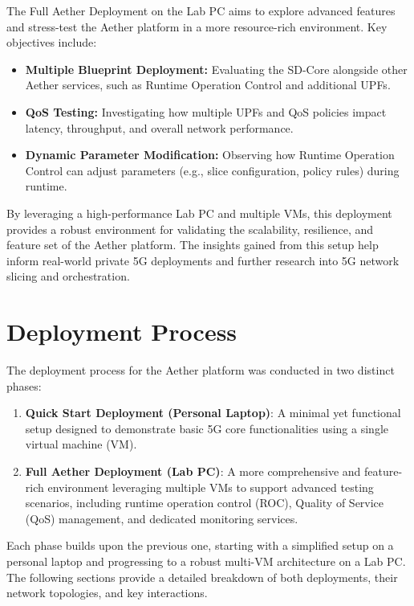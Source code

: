 The Full Aether Deployment on the Lab PC aims to explore advanced features and stress-test the Aether platform in a more resource-rich environment. Key objectives include:

\begin{itemize}
    \item \textbf{Multiple Blueprint Deployment:}  
    Evaluating the SD-Core alongside other Aether services, such as Runtime Operation Control and additional UPFs.

    \item \textbf{QoS Testing:}  
    Investigating how multiple UPFs and QoS policies impact latency, throughput, and overall network performance.

    \item \textbf{Dynamic Parameter Modification:}  
    Observing how Runtime Operation Control can adjust parameters (e.g., slice configuration, policy rules) during runtime.
\end{itemize}


By leveraging a high-performance Lab PC and multiple VMs, this deployment provides a robust environment for validating the scalability, resilience, and feature set of the Aether platform. The insights gained from this setup help inform real-world private 5G deployments and further research into 5G network slicing and orchestration.




\section{Deployment Process}
\label{sec:deployment-process}

The deployment process for the Aether platform was conducted in two distinct phases: 
\begin{enumerate}
    \item \textbf{Quick Start Deployment (Personal Laptop)}: A minimal yet functional setup designed to demonstrate basic 5G core functionalities using a single virtual machine (VM).
    \item \textbf{Full Aether Deployment (Lab PC)}: A more comprehensive and feature-rich environment leveraging multiple VMs to support advanced testing scenarios, including runtime operation control (ROC), Quality of Service (QoS) management, and dedicated monitoring services.
\end{enumerate}

Each phase builds upon the previous one, starting with a simplified setup on a personal laptop and progressing to a robust multi-VM architecture on a Lab PC. The following sections provide a detailed breakdown of both deployments, their network topologies, and key interactions.

